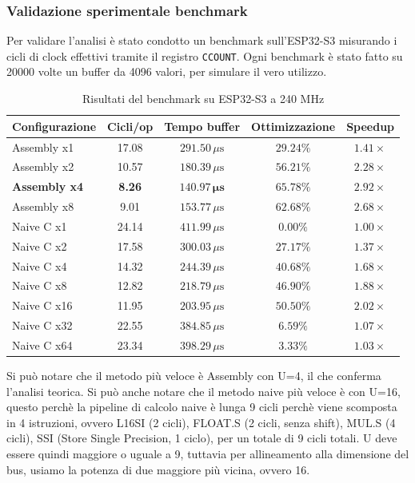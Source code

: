 \subsubsection{Validazione sperimentale benchmark}
Per validare l'analisi è stato condotto un benchmark sull'ESP32-S3 misurando i cicli di clock effettivi tramite il registro \texttt{CCOUNT}.
Ogni benchmark è stato fatto su 20000 volte un buffer da 4096 valori, per simulare il vero utilizzo.


\begin{table}[H]
	\centering
	\begin{tabular}{lcccc}
		\toprule
		\textbf{Configurazione} & \textbf{Cicli/op} & \textbf{Tempo buffer} & \textbf{Ottimizzazione} & \textbf{Speedup} \\
		\midrule
		Assembly x1  & 17.08 & $291.50\,\mu\text{s}$ & $29.24\%$ & $1.41\times$ \\
		Assembly x2  & 10.57 & $180.39\,\mu\text{s}$ & $56.21\%$ & $2.28\times$ \\
		\textbf{Assembly x4} & \textbf{8.26} & $\mathbf{140.97\,\mu\text{s}}$ & $\mathbf{65.78\%}$ & $\mathbf{2.92\times}$ \\
		Assembly x8  &  9.01 & $153.77\,\mu\text{s}$ & $62.68\%$ & $2.68\times$ \\
		\midrule
		Naive C x1   & 24.14 & $411.99\,\mu\text{s}$ & $0.00\%$  & $1.00\times$ \\
		Naive C x2   & 17.58 & $300.03\,\mu\text{s}$ & $27.17\%$ & $1.37\times$ \\
		Naive C x4   & 14.32 & $244.39\,\mu\text{s}$ & $40.68\%$ & $1.68\times$ \\
		Naive C x8   & 12.82 & $218.79\,\mu\text{s}$ & $46.90\%$ & $1.88\times$ \\
		Naive C x16  & 11.95 & $203.95\,\mu\text{s}$ & $50.50\%$ & $2.02\times$ \\
		Naive C x32  & 22.55 & $384.85\,\mu\text{s}$ & $6.59\%$  & $1.07\times$ \\
		Naive C x64  & 23.34 & $398.29\,\mu\text{s}$ & $3.33\%$  & $1.03\times$ \\
		\bottomrule
	\end{tabular}
	\caption{Risultati del benchmark su ESP32-S3 a 240 MHz}
	\label{tab:fpu_benchmark_results}
\end{table}

Si può notare che il metodo più veloce è Assembly con U=4, il che conferma l'analisi teorica.
Si può anche notare che il metodo naive più veloce è con U=16, questo perchè la pipeline di calcolo naive è lunga 9 cicli perchè viene scomposta in 4 istruzioni, ovvero L16SI (2 cicli), FLOAT.S (2 cicli, senza shift), MUL.S (4 cicli), SSI (Store Single Precision, 1 ciclo), per un totale di 9 cicli totali. U deve essere quindi maggiore o uguale a 9, tuttavia per allineamento alla dimensione del bus, usiamo la potenza di due maggiore più vicina, ovvero 16.



